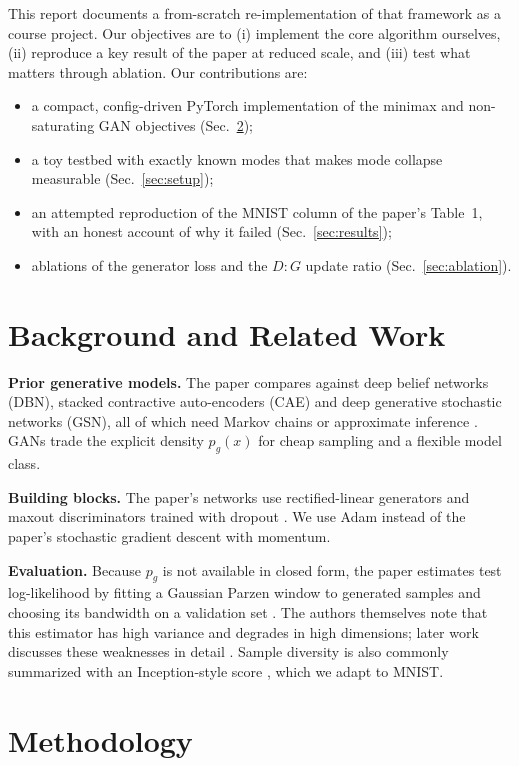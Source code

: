 \documentclass[conference]{IEEEtran}
\begin{document}
This report documents a from-scratch re-implementation of that framework as a course project. Our objectives are to (i) implement the core algorithm ourselves, (ii) reproduce a key result of the paper at reduced scale, and (iii) test what matters through ablation. Our contributions are:
\begin{itemize}
\item a compact, config-driven PyTorch implementation of the minimax and non-saturating GAN objectives (Sec.~\ref{sec:method});
\item a toy testbed with exactly known modes that makes mode collapse measurable (Sec.~\ref{sec:setup});
\item an attempted reproduction of the MNIST column of the paper's Table~1, with an honest account of why it failed (Sec.~\ref{sec:results});
\item ablations of the generator loss and the $D{:}G$ update ratio (Sec.~\ref{sec:ablation}).
\end{itemize}

\section{Background and Related Work}
\label{sec:related}
\textbf{Prior generative models.} The paper compares against deep belief networks (DBN), stacked contractive auto-encoders (CAE) and deep generative stochastic networks (GSN), all of which need Markov chains or approximate inference \cite{goodfellow2014gan}. GANs trade the explicit density $p_g(x)$ for cheap sampling and a flexible model class.

\textbf{Building blocks.} The paper's networks use rectified-linear generators and maxout discriminators \cite{goodfellow2013maxout} trained with dropout \cite{hinton2012dropout}. We use Adam \cite{kingma2015adam} instead of the paper's stochastic gradient descent with momentum.

\textbf{Evaluation.} Because $p_g$ is not available in closed form, the paper estimates test log-likelihood by fitting a Gaussian Parzen window to generated samples and choosing its bandwidth on a validation set \cite{breuleux2011quickly}. The authors themselves note that this estimator has high variance and degrades in high dimensions; later work discusses these weaknesses in detail \cite{theis2016note}. Sample diversity is also commonly summarized with an Inception-style score \cite{salimans2016improved}, which we adapt to MNIST.

\section{Methodology}
\label{sec:method}
\end{document}
